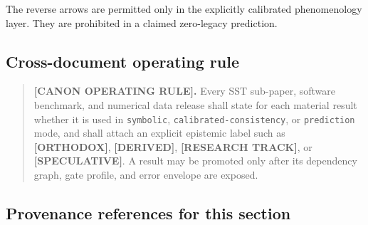 \documentclass[11pt]{article}
\theoremstyle{definition}
\theoremstyle{plain}
\theoremstyle{remark}
\begin{document}
The reverse arrows are permitted only in the explicitly calibrated
phenomenology layer. They are prohibited in a claimed zero-legacy prediction.

\subsection{Cross-document operating rule}
\label{subsec:genesis_cross_document_operating_rule}

\begin{quote}
\textbf{[CANON OPERATING RULE].}
Every SST sub-paper, software benchmark, and numerical data release shall state
for each material result whether it is used in \texttt{symbolic},
\texttt{calibrated-consistency}, or \texttt{prediction} mode, and shall attach an
explicit epistemic label such as \textbf{[ORTHODOX]}, \textbf{[DERIVED]},
\textbf{[RESEARCH TRACK]}, or \textbf{[SPECULATIVE]}.  A result may be promoted
only after its dependency graph, gate profile, and error envelope are exposed.
\end{quote}

\subsection{Provenance references for this section}
\label{subsec:genesis_provenance_references}
\end{document}
